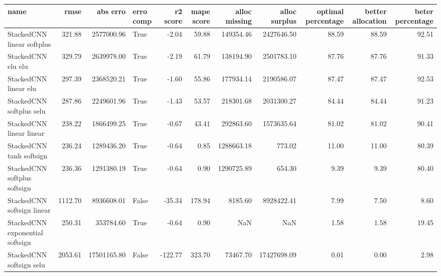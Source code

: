 \begin{tabular}{lrrlrrrrrrr}
\toprule
name & rmse & abs erro & erro comp & r2 score & mape score & alloc missing & alloc surplus & optimal percentage & better allocation & beter percentage \\
\midrule
StackedCNN linear softplus & 321.88 & 2577000.96 & True & -2.04 & 59.88 & 149354.46 & 2427646.50 & 88.59 & 88.59 & 92.51 \\
StackedCNN elu elu & 329.79 & 2639978.00 & True & -2.19 & 61.79 & 138194.90 & 2501783.10 & 87.76 & 87.76 & 91.33 \\
StackedCNN linear elu & 297.39 & 2368520.21 & True & -1.60 & 55.86 & 177934.14 & 2190586.07 & 87.47 & 87.47 & 92.53 \\
StackedCNN softplus selu & 287.86 & 2249601.96 & True & -1.43 & 53.57 & 218301.68 & 2031300.27 & 84.44 & 84.44 & 91.23 \\
StackedCNN linear linear & 238.22 & 1866499.25 & True & -0.67 & 43.41 & 292863.60 & 1573635.64 & 81.02 & 81.02 & 90.41 \\
StackedCNN tanh softsign & 236.24 & 1289436.20 & True & -0.64 & 0.85 & 1288663.18 & 773.02 & 11.00 & 11.00 & 80.39 \\
StackedCNN softplus softsign & 236.36 & 1291380.19 & True & -0.64 & 0.90 & 1290725.89 & 654.30 & 9.39 & 9.39 & 80.40 \\
StackedCNN softsign linear & 1112.70 & 8936608.01 & False & -35.34 & 178.94 & 8185.60 & 8928422.41 & 7.99 & 7.50 & 8.60 \\
StackedCNN exponential softsign & 250.31 & 353784.60 & True & -0.64 & 0.90 & NaN & NaN & 1.58 & 1.58 & 19.45 \\
StackedCNN softsign selu & 2053.61 & 17501165.80 & False & -122.77 & 323.70 & 73467.70 & 17427698.09 & 0.01 & 0.00 & 2.98 \\
\bottomrule
\end{tabular}
